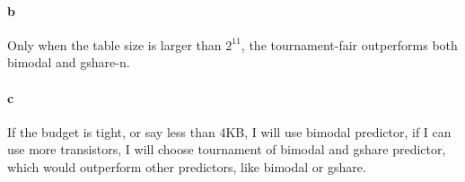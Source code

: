 \documentclass[12pt,letterpaper]{article}
\begin{document}
\paragraph*{b}
Only when the table size is larger than $2^{11}$, the tournament-fair 
outperforms both bimodal and gshare-n.

\paragraph*{c}
If the budget is tight, or say less than 4KB, I will use bimodal predictor, if
I can use more transistors, I will choose tournament of bimodal and gshare
predictor, which would outperform other predictors, like bimodal or gshare.
\end{document}
